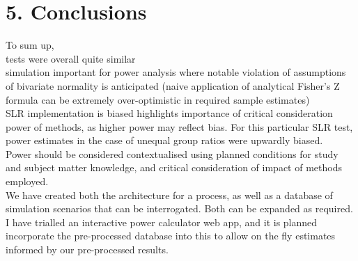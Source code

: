 \chapter*{5. Conclusions}
\setcounter{chapter}{5}
\setcounter{section}{0}

To sum up, 
\\
tests were overall quite similar
\\
simulation important for power analysis where notable violation of assumptions of bivariate normality is anticipated  (naive application of analytical Fisher's Z formula can be extremely over-optimistic in required sample estimates)
\\
SLR implementation is biased\; highlights importance of critical consideration power of methods, as higher power may reflect bias.  For this particular SLR test, power estimates in the case of unequal group ratios were upwardly biased.
\\
Power should be considered contextualised using planned conditions for study and subject matter knowledge, and critical consideration of impact of methods employed.
\\
We have created both the architecture for a process, as well as a database of simulation scenarios that can be interrogated.  Both can be expanded as required. I have trialled an interactive power calculator web app, and it is planned incorporate the pre-processed database into this to allow on the fly estimates informed by our pre-processed results.
